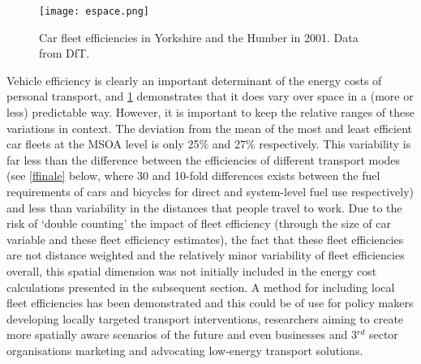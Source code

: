 \begin{figure}[htbp]
  \centerline{
    \texttt{[image: espace.png]}}
  \caption[Car fleet efficiencies in Yorkshire and the Humber in 2001]{Car fleet
efficiencies in Yorkshire and the Humber in 2001. Data from DfT.
}
  \label{fig:espace}
\end{figure}

Vehicle efficiency is clearly an important determinant of the energy costs of
personal transport, and \cref{fig:espace} demonstrates that it does vary over space in a
(more or less) predictable way. However, it is important to keep the relative
ranges of these variations in context. The deviation from the mean of the most
and least efficient car fleets at the MSOA level is only 25\% and 27\% respectively. This
variability is far less than the difference between the efficiencies of
different transport modes (see \cref{ffinale} below,
where 30 and 10-fold differences exists between the
fuel requirements of cars and bicycles for direct and system-level fuel use
respectively) and less than variability in the distances that people travel
to work. Due to the risk of `double counting' the impact of fleet efficiency
(through the size of car variable and these fleet efficiency estimates),
the fact that these fleet efficiencies are not distance weighted and
the relatively minor variability of fleet efficiencies overall,
this spatial dimension was not initially included in the energy cost
calculations presented in the subsequent section.
A method for including local fleet efficiencies has been demonstrated
and this could be of use for policy makers developing locally targeted
transport interventions, researchers aiming to create more
spatially aware scenarios of the future and even businesses and 
3$^{rd}$ sector organisations marketing and advocating low-energy
transport solutions. %


